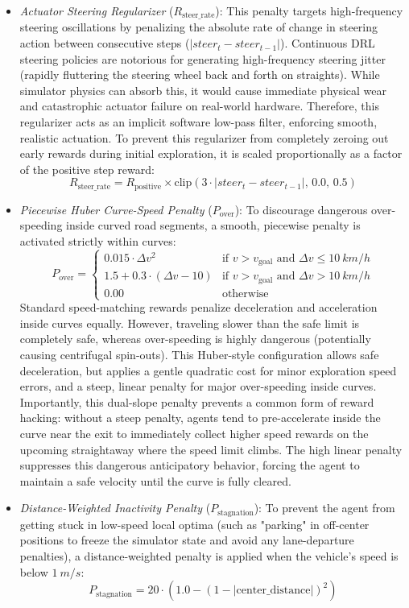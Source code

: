 \documentclass[sn-mathphys,Numbered]{sn-jnl}
\begin{document}
\begin{itemize}
    \item \textit{Actuator Steering Regularizer} ($R_{\text{steer\_rate}}$): This penalty targets high-frequency steering oscillations by penalizing the absolute rate of change in steering action between consecutive steps ($|steer_t - steer_{t-1}|$). Continuous DRL steering policies are notorious for generating high-frequency steering jitter (rapidly fluttering the steering wheel back and forth on straights). While simulator physics can absorb this, it would cause immediate physical wear and catastrophic actuator failure on real-world hardware. Therefore, this regularizer acts as an implicit software low-pass filter, enforcing smooth, realistic actuation. To prevent this regularizer from completely zeroing out early rewards during initial exploration, it is scaled proportionally as a factor of the positive step reward:
        $$R_{\text{steer\_rate}} = R_{\text{positive}} \times \text{clip}\left(3 \cdot |steer_t - steer_{t-1}|, \, 0.0, \, 0.5\right)$$

    \item \textit{Piecewise Huber Curve-Speed Penalty} ($P_{\text{over}}$): To discourage dangerous over-speeding inside curved road segments, a smooth, piecewise penalty is activated strictly within curves:
        $$P_{\text{over}} = \begin{cases}
        0.015 \cdot \Delta v^2 & \text{if } v > v_{\text{goal}} \text{ and } \Delta v \le \SI{10}{km/h} \\
        1.5 + 0.3 \cdot (\Delta v - 10) & \text{if } v > v_{\text{goal}} \text{ and } \Delta v > \SI{10}{km/h} \\
        0.00 & \text{otherwise}
        \end{cases}$$
        Standard speed-matching rewards penalize deceleration and acceleration inside curves equally. However, traveling slower than the safe limit is completely safe, whereas over-speeding is highly dangerous (potentially causing centrifugal spin-outs). This Huber-style configuration allows safe deceleration, but applies a gentle quadratic cost for minor exploration speed errors, and a steep, linear penalty for major over-speeding inside curves. Importantly, this dual-slope penalty prevents a common form of reward hacking: without a steep penalty, agents tend to pre-accelerate inside the curve near the exit to immediately collect higher speed rewards on the upcoming straightaway where the speed limit climbs. The high linear penalty suppresses this dangerous anticipatory behavior, forcing the agent to maintain a safe velocity until the curve is fully cleared.

    \item \textit{Distance-Weighted Inactivity Penalty} ($P_{\text{stagnation}}$): To prevent the agent from getting stuck in low-speed local optima (such as "parking" in off-center positions to freeze the simulator state and avoid any lane-departure penalties), a distance-weighted penalty is applied when the vehicle's speed is below $\SI{1}{m/s}$:
        $$P_{\text{stagnation}} = 20 \cdot \left(1.0 - (1 - |\text{center\_distance}|)^2\right)$$

\end{itemize}
\end{document}
